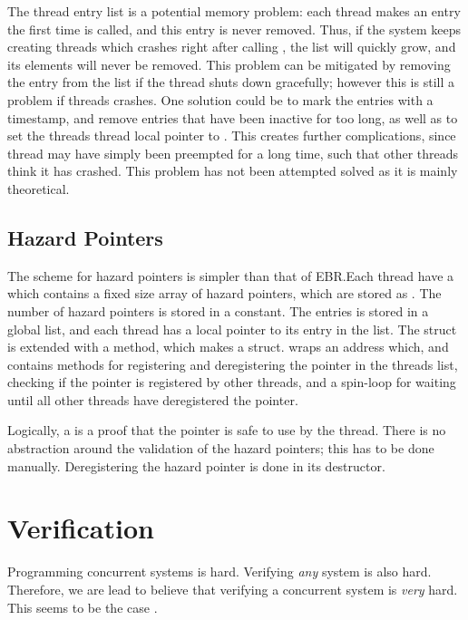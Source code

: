 \documentclass[b5paper]{report}
\begin{document}
The thread entry list is a potential memory problem:
each thread makes an entry the first time  is called, and this entry
is never removed. Thus, if the system keeps creating threads which crashes right
after calling , the list will quickly grow, and its elements will
never be removed. This problem can be mitigated by removing the entry from the
list if the thread shuts down gracefully; however this is still a problem if
threads crashes. One solution could be to mark the entries with a timestamp, and
remove entries that have been inactive for too long, as well as to set the
threads thread local pointer to . This creates further complications,
since thread may have simply been preempted for a long time, such that other
threads think it has crashed.  This problem has not been attempted solved as it
is mainly theoretical.\label{sec:thread-cleanup}

\subsection{Hazard Pointers}

The scheme for hazard pointers is simpler than that of EBR.\@ Each thread have a
 which contains a fixed size array of hazard pointers, which
are stored as . The number of hazard pointers is stored in a
constant. The entries is stored in a global list, and each thread has a local
pointer to its entry in the list. The  struct is extended with a
 method, which makes a  struct.  
wraps an address which, and contains methods for registering and deregistering
the pointer in the threads list, checking if the pointer is registered by other
threads, and a spin-loop for waiting until all other threads have deregistered
the pointer.

Logically, a  is a proof that the pointer is safe to use by the
thread. There is no abstraction around the validation of the hazard pointers;
this has to be done manually. Deregistering the hazard pointer is done in its
destructor.






\section{Verification}
Programming concurrent systems is hard. Verifying \emph{any} system is also
hard. Therefore, we are lead to believe that verifying a concurrent system is
\emph{very} hard. This seems to be the case .
\end{document}
